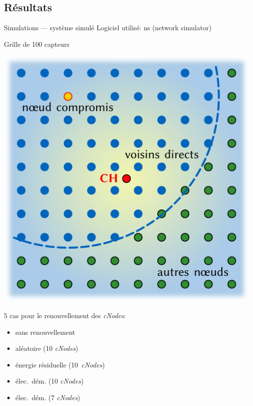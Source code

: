 \documentclass[aspectratio=43]{beamer} %
\newcommand\cns{\textit{cNodes}\xspace}
\begin{document}
\subsection{Résultats}
\begin{frame}{Simulations --- système simulé}
  Logiciel utilisé: ns (network simulator)

  {\small Grille de 100 capteurs}

  \bigskip
  \begin{minipage}{.5\textwidth}
    \includegraphics[height=.7\textheight]{Figs/WSN_neighbors.pdf}
  \end{minipage}\hfill
  \begin{minipage}{.42\textwidth}
    5 cas pour le renouvellement des \cns:
    \begin{itemize}
      \item sans renouvellement
      \item aléatoire (10 \cns)
      \item énergie résiduelle (10~\cns)
      \item élec.\ dém. (10 \cns)
      \item élec.\ dém. (7 \cns)
    \end{itemize}
  \end{minipage}
\end{frame}
\end{document}
